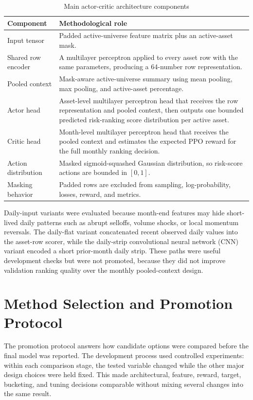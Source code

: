 \begin{table}[H]
\centering
\scriptsize
\caption{Main actor-critic architecture components}
\label{tab:actor_critic_components}
\begin{tabularx}{\textwidth}{L{3.2cm}Y}
\toprule
Component & Methodological role \\
\midrule
Input tensor & Padded active-universe feature matrix plus an active-asset mask. \\
Shared row encoder & A multilayer perceptron applied to every asset row with the same parameters, producing a 64-number row representation. \\
Pooled context & Mask-aware active-universe summary using mean pooling, max pooling, and active-asset percentage. \\
Actor head & Asset-level multilayer perceptron head that receives the row representation and pooled context, then outputs one bounded predicted risk-ranking score distribution per active asset. \\
Critic head & Month-level multilayer perceptron head that receives the pooled context and estimates the expected PPO reward for the full monthly ranking decision. \\
Action distribution & Masked sigmoid-squashed Gaussian distribution, so risk-score actions are bounded in \([0,1]\). \\
Masking behavior & Padded rows are excluded from sampling, log-probability, losses, reward, and metrics. \\
\bottomrule
\end{tabularx}
\end{table}

Daily-input variants were evaluated because month-end features may hide short-lived daily patterns such as abrupt selloffs, volume shocks, or local momentum reversals. The daily-flat variant concatenated recent observed daily values into the asset-row scorer, while the daily-strip convolutional neural network (CNN) variant encoded a short prior-month daily strip. These paths were useful development checks but were not promoted, because they did not improve validation ranking quality over the monthly pooled-context design.

\section{Method Selection and Promotion Protocol}
\label{sec:model_selection}

The promotion protocol answers how candidate options were compared before the final model was reported. The development process used controlled experiments: within each comparison stage, the tested variable changed while the other major design choices were held fixed. This made architectural, feature, reward, target, bucketing, and tuning decisions comparable without mixing several changes into the same result.

